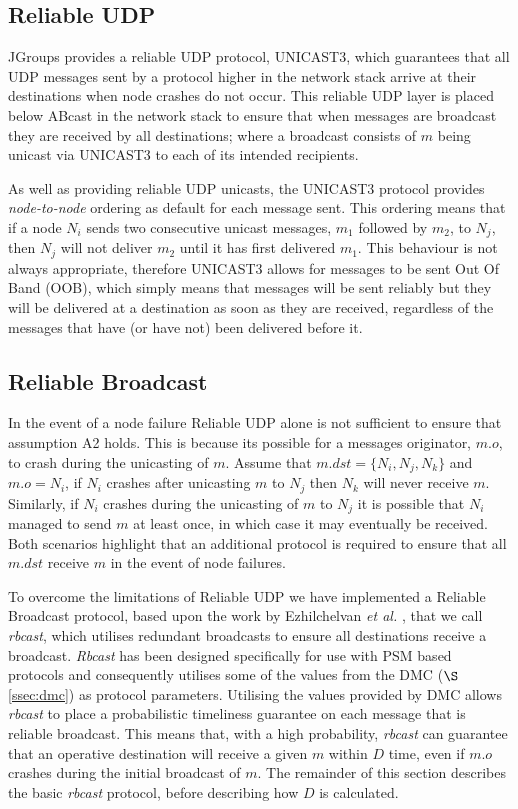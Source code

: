 	\subsection{Reliable UDP}\label{ssec:reliable_udp}
	JGroups provides a reliable UDP protocol, \textsf{UNICAST3}, which guarantees that all UDP messages sent by a protocol higher in the network stack arrive at their destinations when node crashes do not occur.  This reliable UDP layer is placed below \textsf{ABcast} in the network stack to ensure that when messages are broadcast they are received by all destinations; where a broadcast consists of $m$ being unicast via \textsf{UNICAST3} to each of its intended recipients.  
	
	As well as providing reliable UDP unicasts, the \textsf{UNICAST3} protocol provides \emph{node-to-node} ordering as default for each message sent.  This ordering means that if a node $N_i$ sends two consecutive unicast messages, $m_1$ followed by $m_2$, to $N_j$, then $N_j$ will not deliver $m_2$ until it has first delivered $m_1$.  This behaviour is not always appropriate, therefore \textsf{UNICAST3} allows for messages to be sent Out Of Band (OOB), which simply means that messages will be sent reliably but they will be delivered at a destination as soon as they are received, regardless of the messages that have (or have not) been delivered before it.  
	
	\subsection{Reliable Broadcast}\label{ssec:rbcast}
    In the event of a node failure Reliable UDP alone is not sufficient to ensure that assumption A2 holds.  This is because its possible for a messages originator, $m.o$, to crash during the unicasting of $m$.  Assume that $m.dst = \{N_i, N_j, N_k\}$ and $m.o = N_i$, if $N_i$ crashes after unicasting $m$ to $N_j$ then $N_k$ will never receive $m$.  Similarly, if $N_i$ crashes during the unicasting of $m$ to $N_j$ it is possible that $N_i$ managed to send $m$ at least once, in which case it may eventually be received.  Both scenarios highlight that an additional protocol is required to ensure that all $m.dst$ receive $m$ in the event of node failures.  
    
    To overcome the limitations of Reliable UDP we have implemented a Reliable Broadcast protocol, based upon the work by  Ezhilchelvan \emph{et al.} \citep{ezhilchelvan2011near}, that we call \emph{rbcast}, which utilises redundant broadcasts to ensure all destinations receive a broadcast.  \emph{Rbcast} has been designed specifically for use with PSM based protocols and consequently utilises some of the values from the DMC ($\S$ \ref{ssec:dmc}) as protocol parameters.  Utilising the values provided by DMC allows  \emph{rbcast} to place a probabilistic timeliness guarantee on each message that is reliable broadcast.  This means that, with a high probability, \emph{rbcast} can guarantee that an operative destination will receive a given $m$ within $D$ time, even if $m.o$ crashes during the initial broadcast of $m$.  The remainder of this section describes the basic \emph{rbcast} protocol, before describing how $D$ is calculated.
    
